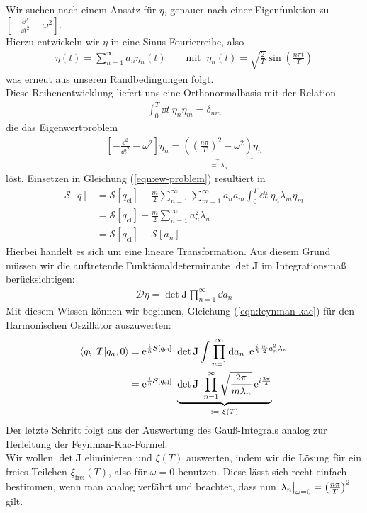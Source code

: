 	Wir suchen nach einem Ansatz für $\eta$, genauer nach einer Eigenfunktion zu $\left[-\frac{\dd^2}{\dd t^2}-\omega^2\right]$. \\
	Hierzu entwickeln wir $\eta$ in eine Sinus-Fourierreihe, also
	\begin{align}
		\eta(t) = \sum_{n=1}^{\infty} a_n\eta_n(t) \qquad \text{mit } \ \eta_n(t) = \sqrt{\frac{2}{T}}\sin\left(\frac{n\pi t}{T}\right)
	\end{align}
was erneut aus unseren Randbedingungen folgt. \\ 
Diese Reihenentwicklung liefert uns eine Orthonormalbasis mit der Relation 
\begin{align}
	\int_0^T \dd t \ \eta_n \eta_m = \delta_{nm}
\end{align}
die das Eigenwertproblem
\begin{align}
	\left[-\frac{\dd^2}{\dd t^2}-\omega^2\right]\eta_n = \underbrace{\left(\left(\frac{n\pi}{T}\right)^2-\omega^2\right)}_{:= \ \lambda_n}\eta_n 
\end{align}
löst. Einsetzen in Gleichung (\ref{eqn:ew-problem}) resultiert in 
\begin{align}
\mathcal{S}[q] &= \mathcal{S}[q_{\text{cl}}] + \frac{m}{2}\sum_{n=1}^{\infty}\sum_{m=1}^{\infty}a_na_m \int_0^T \dd t \ \eta_n\lambda_m\eta_m \nonumber \\
&= \mathcal{S}[q_{\text{cl}}] + \frac{m}{2}\sum_{n=1}^{\infty}a_n^2\lambda_n \nonumber \\
&= \mathcal{S}[q_{\text{cl}}] + \mathcal{S}[a_n]
\end{align}
 Hierbei handelt es sich um eine lineare Transformation. Aus diesem Grund müssen wir die auftretende Funktionaldeterminante $\operatorname{det}\mathbf{J}$ im Integrationsmaß berücksichtigen:
 \begin{align*}
 	\mathcal{D}\eta = \operatorname{det}\mathbf{J} \prod_{n=1}^{\infty} \dd a_n
 \end{align*}
 Mit diesem Wissen können wir beginnen, Gleichung (\ref{eqn:feynman-kac}) für den Harmonischen Oszillator auszuwerten:
 \begin{align}
 	\braket{q_b,T}{q_a,0} &= \operatorname{e}^{\ihbar\mathcal{S}[q_{\text{cl}}]} \ \operatorname{det}\mathbf{J} \int \prod_{n=1}^{\infty} \dd a_n \  \operatorname{e}^{\ihbar\frac{m}{2} a_n^2 \lambda_n} \nonumber\\
 	&= \operatorname{e}^{\ihbar\mathcal{S}[q_{\text{cl}}]} \ \underbrace{\operatorname{det}\mathbf{J} \  \prod_{n=1}^{\infty} \sqrt{\frac{2\pi}{m\lambda_n}} \operatorname{e}^{i\frac{3\pi}{4}}}_{:= \ \xi(T)}
 \end{align}
 Der letzte Schritt folgt aus der Auswertung des Gauß-Integrals analog zur Herleitung der Feynman-Kac-Formel. \\
 Wir wollen $\operatorname{det}\mathbf{J}$ eliminieren und $\xi(T)$ auswerten, indem wir die Lösung für ein freies Teilchen $\xi_{\text{frei}}(T)$, also für $\omega = 0$ benutzen. Diese lässt sich recht einfach bestimmen, wenn man analog verfährt und beachtet, dass nun $\eval{\lambda_n}_{\omega = 0} = \left(\frac{n\pi}{T}\right)^2$ gilt. \\
 

